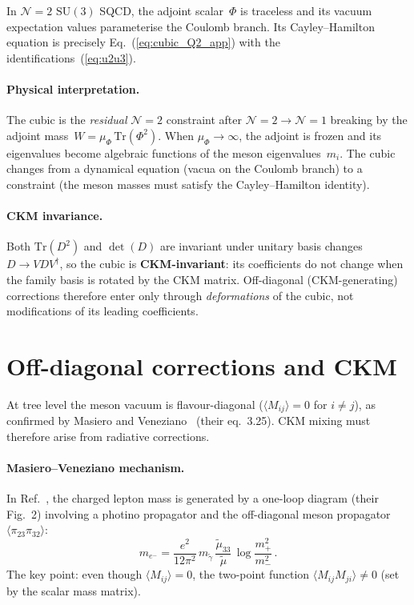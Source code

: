 \documentclass[12pt,a4paper]{article}
\newcommand{\SU}{\mathrm{SU}}
\begin{document}
In $\mathcal{N}{=}2$ $\SU(3)$ SQCD, the adjoint scalar~$\Phi$ is
traceless and its vacuum expectation values parameterise the
Coulomb branch. Its Cayley--Hamilton equation is precisely
Eq.~(\ref{eq:cubic_Q2_app}) with the identifications~(\ref{eq:u2u3}).

\paragraph{Physical interpretation.}
The cubic is the \emph{residual} $\mathcal{N}{=}2$ constraint
after $\mathcal{N}{=}2 \to \mathcal{N}{=}1$ breaking by the
adjoint mass~$W = \mu_\Phi\,\mathrm{Tr}(\Phi^2)$.
When $\mu_\Phi \to \infty$, the adjoint is frozen and its
eigenvalues become algebraic functions of the meson
eigenvalues~$m_i$.
The cubic changes from a dynamical equation (vacua on the Coulomb
branch) to a constraint (the meson masses must satisfy the
Cayley--Hamilton identity).

\paragraph{CKM invariance.}
Both $\mathrm{Tr}(D^2)$ and $\det(D)$ are invariant under
unitary basis changes $D \to V D V^\dagger$,
so the cubic is \textbf{CKM-invariant}:
its coefficients do not change when the family basis is rotated
by the CKM matrix.
Off-diagonal (CKM-generating) corrections therefore enter only
through \emph{deformations} of the cubic, not modifications of
its leading coefficients.

\section{Off-diagonal corrections and CKM}
\label{app:CKM}

At tree level the meson vacuum is flavour-diagonal
($\langle M_{ij}\rangle = 0$ for $i \neq j$),
as confirmed by Masiero and
Veneziano~\cite{MasieroVeneziano:1985} (their eq.~3.25).
CKM mixing must therefore arise from radiative corrections.

\paragraph{Masiero--Veneziano mechanism.}
In Ref.~\cite{MasieroVeneziano:1985}, the charged lepton mass
is generated by a one-loop diagram (their Fig.~2) involving a
photino propagator and the off-diagonal meson propagator
$\langle \pi_{23}\pi_{32}\rangle$:
\begin{equation}
  m_{e^-} = \frac{e^2}{12\pi^2}\,m_{\tilde\gamma}\,
  \frac{\tilde\mu_{33}}{\tilde\mu}\,
  \log\frac{m_+^2}{m_-^2}\,.
  \label{eq:MV_loop}
\end{equation}
The key point: even though $\langle M_{ij}\rangle = 0$, the
two-point function $\langle M_{ij}M_{ji}\rangle \neq 0$
(set by the scalar mass matrix).
\end{document}

